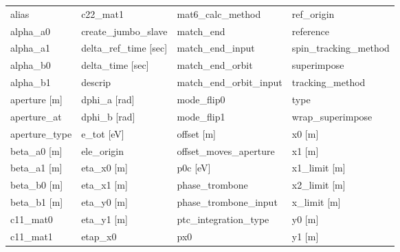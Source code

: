  \begin{tabular}{llll} \toprule
alias                            & c22_mat1                         & mat6_calc_method                 & ref_origin                       \\
alpha_a0                         & create_jumbo_slave               & match_end                        & reference                        \\
alpha_a1                         & delta_ref_time [sec]             & match_end_input                  & spin_tracking_method             \\
alpha_b0                         & delta_time [sec]                 & match_end_orbit                  & superimpose                      \\
alpha_b1                         & descrip                          & match_end_orbit_input            & tracking_method                  \\
aperture [m]                     & dphi_a [rad]                     & mode_flip0                       & type                             \\
aperture_at                      & dphi_b [rad]                     & mode_flip1                       & wrap_superimpose                 \\
aperture_type                    & e_tot [eV]                       & offset [m]                       & x0 [m]                           \\
beta_a0 [m]                      & ele_origin                       & offset_moves_aperture            & x1 [m]                           \\
beta_a1 [m]                      & eta_x0 [m]                       & p0c [eV]                         & x1_limit [m]                     \\
beta_b0 [m]                      & eta_x1 [m]                       & phase_trombone                   & x2_limit [m]                     \\
beta_b1 [m]                      & eta_y0 [m]                       & phase_trombone_input             & x_limit [m]                      \\
c11_mat0                         & eta_y1 [m]                       & ptc_integration_type             & y0 [m]                           \\
c11_mat1                         & etap_x0                          & px0                              & y1 [m]                           \\

\end{tabular}
